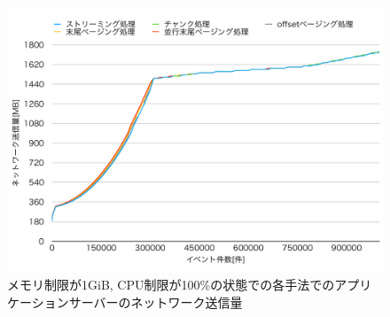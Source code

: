 \documentclass[../../../main]{subfiles}
\begin{document}
    \begin{figure}[H]
        \centering
        \includegraphics[width=12cm]{graph}
        \caption{メモリ制限が1GiB, CPU制限が100\%の状態での各手法でのアプリケーションサーバーのネットワーク送信量}
        \label{fig:app-net-out}
    \end{figure}
\end{document}
